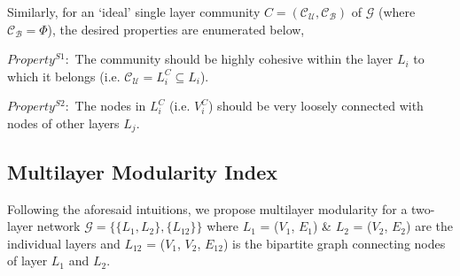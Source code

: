 
Similarly, for an `ideal' single layer community $C= (\mathcal{C_U},\mathcal{C_B})$ of $\mathcal{G}$ (where
$\mathcal{C_B} = \Phi$), the desired properties are enumerated below,

\textbf{$Property^{S1}:$} The community should be highly cohesive within the layer $L_i$ to which it
belongs (i.e. $\mathcal{C_U} = L^C_i \subseteq L_i$).

\textbf{$Property^{S2}:$} The nodes in $L^C_i$ (i.e. $V^C_i$) should be very loosely connected with nodes of other layers $L_j$.

\subsection{Multilayer Modularity Index}\label{mult_mod}
Following the aforesaid intuitions, we propose multilayer modularity for a two-layer network
$\mathcal{G} = \{\{L_1, L_2\}, \{L_{12}\}\}$
where $L_1$ = ($V_1$, $E_1$) \& $L_2$ = ($V_2$, $E_2$) are the individual layers
and $L_{12}$ = ($V_1$, $V_2$, $E_{12}$) is the bipartite graph connecting nodes of layer $L_1$ and $L_2$.

